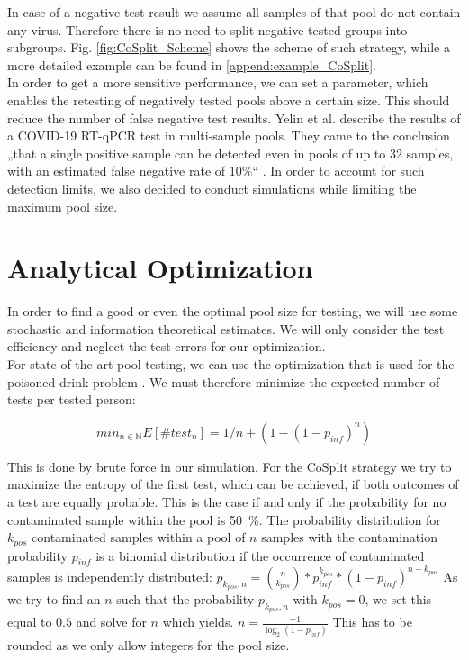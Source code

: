 \documentclass[fleqn,10pt]{wlscirep}
\begin{document}
	In case of a negative test result we assume all samples of that pool do not contain any virus. Therefore there is no need to split negative tested groups into subgroups. Fig. \ref{fig:CoSplit_Scheme} shows the scheme of such strategy, while a more detailed example can be found in \ref{append:example_CoSplit}.\\
	
	In order to get a more sensitive performance, we can set a parameter, which enables the retesting of negatively tested pools above a certain size. This should reduce the number of false negative test results. Yelin et al. describe the results of a COVID-19 RT-qPCR test in multi-sample pools. They came to the conclusion „that a single positive sample can be detected even in pools of up to 32 samples, with an estimated false negative rate of 10\%“ \cite{Yelin_2020}. In order to account for such detection limits, we also decided to conduct simulations while limiting the maximum pool size.
	
	
	
	\section{Analytical Optimization}
	\label{sec:analytics}
	
	In order to find a good or even the optimal pool size for testing, we will use some stochastic and information theoretical estimates. We will only consider the test efficiency and neglect the test errors for our optimization. \\
	
	For state of the art pool testing, we can use the optimization that is used for the poisoned drink problem \cite{poisoned_drink}. We must therefore minimize the expected number of tests per tested person:
	\begin{ceqn}
		\begin{equation}
		{min}_{n\in \mathbb{N}}  E[\#test_n] = 1/n+(1-(1-p_{inf})^n)
		\end{equation}
	\end{ceqn}
	
	This is done by brute force in our simulation.
	For the CoSplit strategy we try to maximize the entropy of the first test, which can be achieved, if both outcomes of a test are equally probable. This is the case if and only if the probability for no contaminated sample within the pool is \SI{50}{\percent}.
	The probability distribution for $k_{pos}$ contaminated samples within a pool of $n$ samples with the contamination probability $p_{inf}$ is a binomial distribution if the occurrence of contaminated samples is independently distributed: 
	$p_{k_{pos},n} = \binom{n}{k_{pos}} * p_{inf}^{k_{pos}} * (1-p_{inf})^{n-k_{pos}}$
	As we try to find an $n$ such that the probability $p_{k_{pos},n}$ with $k_{pos} = 0$, we set this equal to $0.5$ and solve for $n$ which yields.
	$n = \frac{-1}{\log_2(1-p_{inf})}$ This has to be rounded as we only allow integers for the pool size.\\
	
\end{document}
